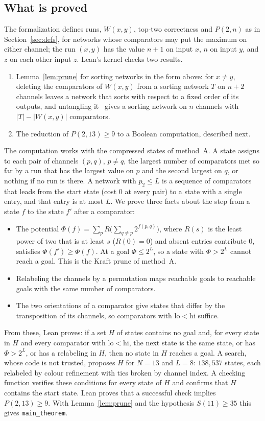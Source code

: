 \subsection{What is proved}
The formalization defines runs, $W(x,y)$, top-two correctness and $P(2,n)$ as in Section~\ref{sec:defs}, for
networks whose comparators may put the maximum on either channel; the run $(x,y)$ has the value $n+1$ on input
$x$, $n$ on input $y$, and $z$ on each other input $z$. Lean's kernel checks two results.
\begin{enumerate}[label=(\roman*)]
\item Lemma~\ref{lem:prune} for sorting networks in the form above: for $x\ne y$, deleting the comparators of
$W(x,y)$ from a sorting network $T$ on $n+2$ channels leaves a network that sorts with respect to a fixed order
of its outputs, and untangling it~\cite[Exercise~5.3.4--16]{Knu98} gives a sorting network on $n$ channels
with $|T|-|W(x,y)|$ comparators.
\item The reduction of $P(2,13)\ge9$ to a Boolean computation, described next.
\end{enumerate}
The computation works with the compressed states of method~A. A state assigns to each pair of channels
$(p,q)$, $p\ne q$, the largest number of comparators met so far by a run that has the largest value on $p$ and
the second largest on $q$, or nothing if no run is there. A network with $p_2\le L$ is a sequence of comparators
that leads from the start state (cost $0$ at every pair) to a state with a single entry, and that entry is at
most $L$. We prove three facts about the step from a state $f$ to the state $f'$ after a comparator:
\begin{itemize}
\item The potential $\Phi(f)=\sum_pR\bigl(\sum_{q\ne p}2^{f(p,q)}\bigr)$, where $R(s)$ is the least power of
two that is at least $s$ ($R(0)=0$) and absent entries contribute $0$, satisfies $\Phi(f')\ge\Phi(f)$. At a
goal $\Phi\le2^L$, so a state with $\Phi>2^L$ cannot reach a goal. This is the Kraft prune of method~A.
\item Relabeling the channels by a permutation maps reachable goals to reachable goals with the same number of
comparators.
\item The two orientations of a comparator give states that differ by the transposition of its channels, so
comparators with $\mathrm{lo}<\mathrm{hi}$ suffice.
\end{itemize}
From these, Lean proves: if a set $H$ of states contains no goal and, for every state in $H$ and every
comparator with $\mathrm{lo}<\mathrm{hi}$, the next state is the same state, or has $\Phi>2^L$, or has a
relabeling in $H$, then no state in $H$ reaches a goal. A search, whose code is not trusted, proposes $H$ for
$N=13$ and $L=8$: $138{,}537$ states, each relabeled by colour refinement with ties broken by channel index.
A checking function verifies these conditions for every state of $H$ and confirms that $H$ contains the
start state. Lean proves that a successful check implies $P(2,13)\ge9$. With Lemma~\ref{lem:prune} and the
hypothesis $S(11)\ge35$ this gives \texttt{main\_theorem}.

